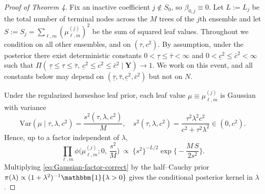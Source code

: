 \documentclass[11pt]{article}
\theoremstyle{plain}
\theoremstyle{definition}
\theoremstyle{plain}
\begin{document}
\begin{proof}[Proof of Theorem 4]
Fix an inactive coefficient $j\notin S_0$, so $\beta_{0,j}\equiv 0$.  
Let $L:=L_j$ be the total number of terminal nodes across the $M$ trees of
the $j$th ensemble and let $S:=S_j=\sum_{\ell,m}(\mu^{(j)}_{\ell,m})^2$ be the
sum of squared leaf values.  Throughout we condition on all other ensembles, and on $(\tau,c^2)$.
By assumption, under the posterior there exist deterministic constants
$0<\underline\tau\le \bar\tau<\infty$ and $0<\underline c^2\le \bar c^2<\infty$ such that
$\Pi(\,\underline\tau\le \tau\le \bar\tau,\ \underline c^2\le c^2\le \bar c^2\mid \bm Y)\to 1$.
We work on this event, and all constants below may depend on $(\underline\tau,\bar\tau,\underline c^2,\bar c^2)$ but not on $N$.

Under the regularized horseshoe leaf prior, each leaf value
$\mu\equiv \mu_{\ell,m}^{(j)}$ is Gaussian with variance
\[
\text{Var}(\mu\mid \tau,\lambda,c^2)=\frac{s^2(\tau,\lambda,c^2)}{M},\quad
s^2(\tau,\lambda,c^2)=\frac{\tau^2\lambda^2c^2}{c^2+\tau^2\lambda^2}\in(0,c^2).
\]
Hence, up to a factor independent of $\lambda$,
\begin{equation}
\label{eq:Gaussian-factor-correct}
\prod_{\ell,m}\phi \Big(\mu_{\ell,m}^{(j)};0,\,\frac{s^2}{M}\Big)
~\propto~
\{s^2\}^{-L/2}\exp \Big\{-\frac{M\,S}{2s^2}\Big\}.
\end{equation}
Multiplying \eqref{eq:Gaussian-factor-correct} by the half--Cauchy prior
$\pi(\lambda)\propto (1+\lambda^2)^{-1}\mathbbm{1}\{\lambda>0\}$ gives the conditional posterior kernel in $\lambda$.


\end{proof}
\end{document}
